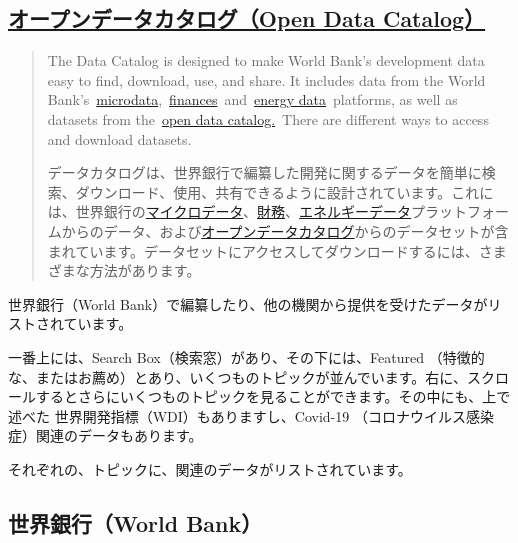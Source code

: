 \documentclass[
  xelatex, ja=standard]{bxjsbook}
\theoremstyle{definition}
\theoremstyle{definition}
\theoremstyle{definition}
\theoremstyle{definition}
\theoremstyle{remark}
\begin{document}
\hypertarget{ux30aaux30fcux30d7ux30f3ux30c7ux30fcux30bfux30abux30bfux30edux30b0open-data-catalog}{%
\subsection{\texorpdfstring{\href{https://datacatalog.worldbank.org/home}{オープンデータカタログ（Open Data Catalog）}}{オープンデータカタログ（Open Data Catalog）}}\label{ux30aaux30fcux30d7ux30f3ux30c7ux30fcux30bfux30abux30bfux30edux30b0open-data-catalog}}

\begin{quote}
The Data Catalog is designed to make World Bank's development data easy to find, download, use, and share. It includes data from the World Bank's~\href{https://microdata.worldbank.org/}{microdata},~\href{http://finances.worldbank.org/}{finances}~and~\href{https://energydata.info/}{energy data}~platforms, as well as datasets from the~\href{https://data.worldbank.org/}{open data catalog.}~There are different ways to access and download datasets.

データカタログは、世界銀行で編纂した開発に関するデータを簡単に検索、ダウンロード、使用、共有できるように設計されています。これには、世界銀行の\href{https://microdata.worldbank.org/}{マイクロデータ}、\href{http://finances.worldbank.org/}{財務}、\href{https://energydata.info/}{エネルギーデータ}プラットフォームからのデータ、および\href{https://data.worldbank.org/}{オープンデータカタログ}からのデータセットが含まれています。データセットにアクセスしてダウンロードするには、さまざまな方法があります。
\end{quote}

世界銀行（World Bank）で編纂したり、他の機関から提供を受けたデータがリストされています。

一番上には、Search Box（検索窓）があり、その下には、Featured （特徴的な、またはお薦め）とあり、いくつものトピックが並んでいます。右に、スクロールするとさらにいくつものトピックを見ることができます。その中にも、上で述べた 世界開発指標（WDI）もありますし、Covid-19 （コロナウイルス感染症）関連のデータもあります。

それぞれの、トピックに、関連のデータがリストされています。

\hypertarget{ux4e16ux754cux9280ux884cworld-bank}{%
\subsection{世界銀行（World Bank）}\label{ux4e16ux754cux9280ux884cworld-bank}}
\end{document}
